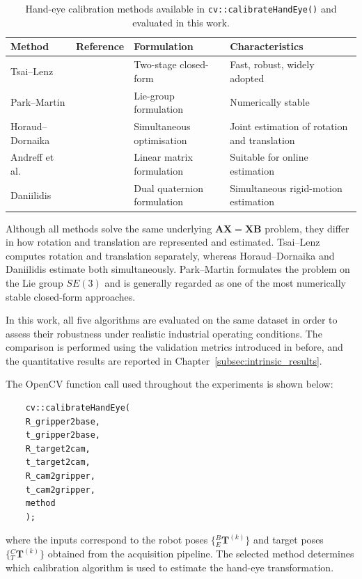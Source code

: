 \begin{table}[htbp]
	\centering
	\caption{Hand-eye calibration methods available in
		\texttt{cv::calibrateHandEye()} and evaluated in this work.}
	\label{tab:hec_methods}
	\begin{tabular}{llll}
		\toprule
		\textbf{Method} &
		\textbf{Reference} &
		\textbf{Formulation} &
		\textbf{Characteristics} \\
		\midrule
		Tsai--Lenz
		& \cite{tsai1989new}
		& Two-stage closed-form
		& Fast, robust, widely adopted \\
		Park--Martin
		& \cite{park1994robot}
		& Lie-group formulation
		& Numerically stable \\
		Horaud--Dornaika
		& \cite{horaud1995hand}
		& Simultaneous optimisation
		& Joint estimation of rotation and translation \\
		Andreff et al.
		& \cite{andreff1999online}
		& Linear matrix formulation
		& Suitable for online estimation \\
		Daniilidis
		& \cite{daniilidis1999hand}
		& Dual quaternion formulation
		& Simultaneous rigid-motion estimation \\
		\bottomrule
	\end{tabular}
\end{table}

Although all methods solve the same underlying
$\mathbf{A}\mathbf{X}=\mathbf{X}\mathbf{B}$ problem, they differ in how
rotation and translation are represented and estimated. Tsai--Lenz
computes rotation and translation separately, whereas Horaud--Dornaika
and Daniilidis estimate both simultaneously. Park--Martin formulates
the problem on the Lie group $SE(3)$ and is generally regarded as one
of the most numerically stable closed-form approaches.

In this work, all five algorithms are evaluated on the same dataset in
order to assess their robustness under realistic industrial operating
conditions. The comparison is performed using the validation metrics
introduced in before, and the quantitative
results are reported in Chapter~\ref{subsec:intrinsic_results}.

The OpenCV function call used throughout the experiments is shown below:

\begin{verbatim}
	cv::calibrateHandEye(
	R_gripper2base,
	t_gripper2base,
	R_target2cam,
	t_target2cam,
	R_cam2gripper,
	t_cam2gripper,
	method
	);
\end{verbatim}

where the inputs correspond to the robot poses
$\{{}^B_E\mathbf{T}^{(k)}\}$ and target poses
$\{{}^C_T\mathbf{T}^{(k)}\}$ obtained from the acquisition pipeline.
The selected method determines which calibration algorithm is used to
estimate the hand-eye transformation.

